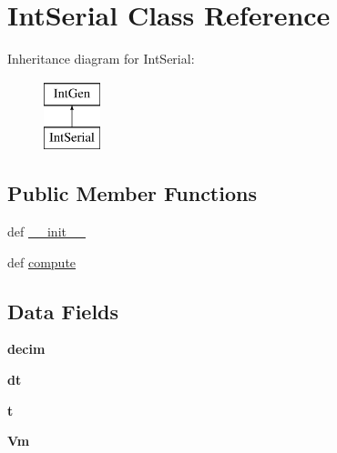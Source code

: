 \hypertarget{classcell__mdl_1_1_int_serial}{
\section{IntSerial Class Reference}
\label{classcell__mdl_1_1_int_serial}
}
Inheritance diagram for IntSerial:\begin{figure}[H]
\begin{center}
\leavevmode
\includegraphics[height=2cm]{classcell__mdl_1_1_int_serial}
\end{center}
\end{figure}
\subsection*{Public Member Functions}
\begin{DoxyCompactItemize}
\item 
def \hyperlink{classcell__mdl_1_1_int_serial_ac775ee34451fdfa742b318538164070e}{\_\-\_\-init\_\-\_\-}
\item 
def \hyperlink{classcell__mdl_1_1_int_serial_aaa2084b96999fb1734fd2f330bfa01a6}{compute}
\end{DoxyCompactItemize}
\subsection*{Data Fields}
\begin{DoxyCompactItemize}
\item 
\hypertarget{classcell__mdl_1_1_int_serial_a536f1b0a72368eae0f278666b6a196eb}{
{\bfseries decim}}
\label{classcell__mdl_1_1_int_serial_a536f1b0a72368eae0f278666b6a196eb}

\item 
\hypertarget{classcell__mdl_1_1_int_serial_a770f288d3048ff6cbee9faa0969fd6b0}{
{\bfseries dt}}
\label{classcell__mdl_1_1_int_serial_a770f288d3048ff6cbee9faa0969fd6b0}

\item 
\hypertarget{classcell__mdl_1_1_int_serial_aaccc9105df5383111407fd5b41255e23}{
{\bfseries t}}
\label{classcell__mdl_1_1_int_serial_aaccc9105df5383111407fd5b41255e23}

\item 
\hypertarget{classcell__mdl_1_1_int_serial_ae2db27d1cd25ddde897eb53858084365}{
{\bfseries Vm}}
\label{classcell__mdl_1_1_int_serial_ae2db27d1cd25ddde897eb53858084365}

\end{DoxyCompactItemize}


